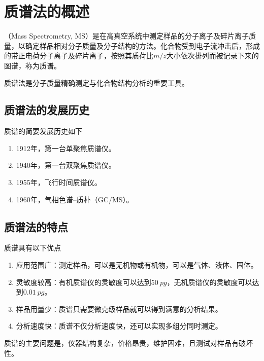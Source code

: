 \section{质谱法的概述}

（Mass Spectrometry, MS）是在高真空系统中测定样品的分子离子及碎片离子质量，以确定样品相对分子质量及分子结构的方法。化合物受到电子流冲击后，形成的带正电荷分子离子及碎片离子，按照其质荷比$m/z$大小依次排列而被记录下来的图谱，称为质谱。

质谱法是分子质量精确测定与化合物结构分析的重要工具。

\subsection{质谱法的发展历史}
质谱的简要发展历史如下
\begin{enumerate}
    \item 1912年，第一台单聚焦质谱仪。
    \item 1940年，第一台双聚焦质谱仪。
    \item 1955年，飞行时间质谱仪。
    \item 1960年，气相色谱--质朴（GC/MS）。
\end{enumerate}

\subsection{质谱法的特点}
质谱具有以下优点
\begin{enumerate}
    \item 应用范围广：测定样品，可以是无机物或有机物，可以是气体、液体、固体。
    \item 灵敏度较高：有机质谱仪的灵敏度可以达到$\SI{50}{pg}$，无机质谱仪的灵敏度可以达到$\SI{0.01}{pg}$。
    \item 样品用量少：质谱只需要微克级样品就可以得到满意的分析结果。
    \item 分析速度快：质谱不仅分析速度快，还可以实现多组分同时测定。
\end{enumerate}
质谱的主要问题是，仪器结构复杂，价格昂贵，维护困难，且测试对样品有破坏性。